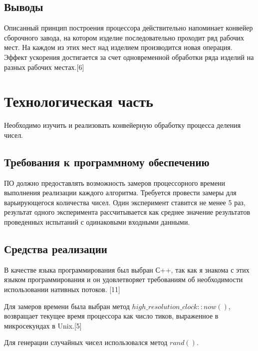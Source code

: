 \documentclass[a4paper,14pt]{article} %
\begin{document}
	\subsection{Выводы}
	\hfill
	
	Описанный принцип построения процессора действительно напоминает конвейер сборочного завода, на котором изделие последовательно проходит ряд рабочих мест. На каждом из этих мест над изделием производится новая операция. Эффект ускорения достигается за счет одновременной обработки ряда изделий на разных рабочих местах.[6]
	
		
    	\newpage

        \section{Технологическая часть}
        \hfill
        
        Необходимо изучить и реализовать конвейерную обработку процесса деления чисел. 
        
        \subsection{Требования к программному обеспечению}
        \hfill
        
        ПО должно предоставлять возможность замеров процессорного времени выполнения реализации каждого алгоритма. Требуется провести замеры для варьирующегося количества чисел. Один эксперимент ставится не менее 5 раз, результат одного эксперимента рассчитывается как среднее значение результатов проведенных испытаний с одинаковыми входными данными.
        \hfill
        
        \subsection{Средства реализации}
        \hfill
        
        В качестве языка программирования был выбран С++, так как я знакома с этих языком программирования и он удовлетворяет требованиям об необходимости использовании нативных потоков. [11]
        \hfill
        
        Для замеров времени была выбран метод $high\_resolution\_clock::now()$, возвращает текущее время процессора как число тиков, выраженное в микросекундах в Unix.[5]
        \hfill
        
        Для генерации случайных чисел использовался метод $rand()$. 
        
\end{document}
